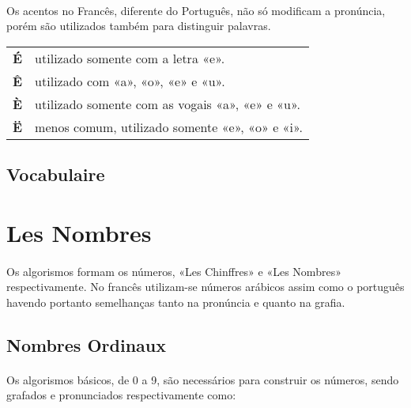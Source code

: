 \documentclass{article}
\begin{document}
        \paragraph{}Os acentos no Francês, diferente do Português, não só modificam a pronúncia, porém são utilizados também para distinguir palavras.
            \begin{center}
                \begin{tabular}{c  l}
                    \textbf{É} & utilizado somente com a letra «e».\\
                    \textbf{Ê} & utilizado com «a», «o», «e» e «u».\\
                    \textbf{È} & utilizado somente com as vogais «a», «e» e «u».\\
                    \textbf{Ë} & menos comum, utilizado somente «e», «o» e «i».\\                  
                \end{tabular}
            \end{center}
        
    \subsection{Vocabulaire}

\newpage

\section{Les Nombres}
    \paragraph{}Os algorismos formam os números, «Les Chinffres» e «Les Nombres» respectivamente. No francês utilizam-se números arábicos assim como o português havendo portanto semelhanças tanto na pronúncia e quanto na grafia. 

    \subsection{Nombres Ordinaux}
        \paragraph{}Os algorismos básicos, de 0 a 9, são necessários para construir os números, sendo grafados e pronunciados respectivamente como: 
            
\end{document}
